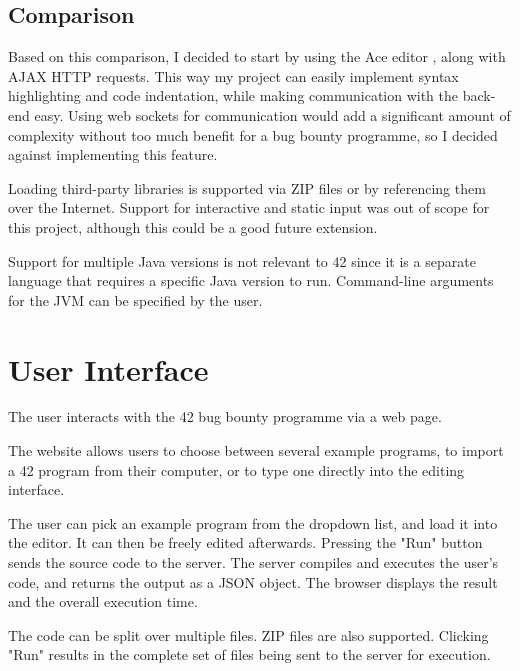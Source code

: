 
\section{Comparison}


Based on this comparison, I decided to start by using the Ace editor \cite{mozilla-2022}, along with AJAX HTTP requests. This way my project can easily implement syntax highlighting and code indentation, while making communication with the back-end easy. Using web sockets for communication would add a significant amount of complexity without too much benefit for a bug bounty programme, so I decided against implementing this feature.

Loading third-party libraries is supported via ZIP files or by referencing them over the Internet. Support for interactive and static input was out of scope for this project, although this could be a good future extension.

Support for multiple Java versions is not relevant to 42 since it is a separate language that requires a specific Java version to run. Command-line arguments for the JVM can be specified by the user.

\chapter{User Interface}

The user interacts with the 42 bug bounty programme via a web page.

The website allows users to choose between several example programs, to import a 42 program from their computer, or to type one directly into the editing interface.

The user can pick an example program from the dropdown list, and load it into the editor. It can then be freely edited afterwards. Pressing the "Run" button sends the source code to the server. The server compiles and executes the user's code, and returns the output as a JSON object. The browser displays the result and the overall execution time.


The code can be split over multiple files. ZIP files are also supported. Clicking "Run" results in the complete set of files being sent to the server for execution.

